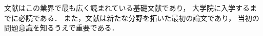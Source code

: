 \documentclass[lualatex,ja=standard,magstyle=real,12pt]{bxjsarticle}
\begin{document}
文献\autocite{hoge2000,foobar1990}はこの業界で最も広く読まれている基礎文献であり，
大学院に入学するまでに必読である．
また，文献\autocite{hoge2001}は新たな分野を拓いた最初の論文であり，
当初の問題意識を知るうえで重要である．
\printbibliography
\end{document}
